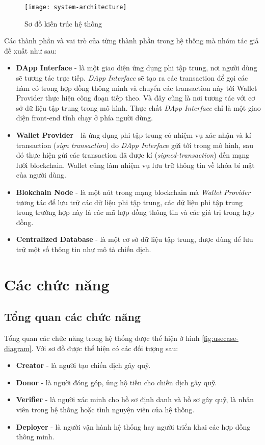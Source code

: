 \documentclass[../main-report.tex]{subfiles}
\begin{document}
\begin{figure}[ht!]
\begin{center}
\label{fig:system-architecture}
\texttt{[image: system-architecture]}
\caption{Sơ đồ kiến trúc hệ thống}
\end{center}
\end{figure}

Các thành phần và vai trò của từng thành phần trong hệ thống mà nhóm tác giả đề xuất như sau:

\begin{itemize}
\item \textbf{DApp Interface} - là một giao diện ứng dụng phi tập trung, nơi người dùng sẽ tương tác trực tiếp. \textit{DApp Interface} sẽ tạo ra các \gls{transaction} để gọi các hàm có trong hợp đồng thông minh và chuyển các \gls{transaction} này tới Wallet Provider thực hiện công đoạn tiếp theo. Và đây cũng là nơi tương tác với cơ sở dữ liệu tập trung trong mô hình. Thực chất \textit{DApp Interface} chỉ là một giao diện front-end tĩnh chạy ở phía người dùng.
\item \textbf{Wallet Provider} - là ứng dụng phi tập trung có nhiệm vụ xác nhận và kí transaction (\textit{sign transaction}) do \textit{DApp Interfac}e gửi tới trong mô hình, sau đó thực hiện gửi các \gls{transaction} đã được kí (\textit{signed-transaction}) đến mạng lưới \gls{blockchain}. Wallet cũng làm nhiệm vụ lưu trữ thông tin về khóa bí mật của người dùng.
\item \textbf{Blokchain Node} - là một nút trong mạng \gls{blockchain} mà \textit{Wallet Provider} tương tác để lưu trữ các dữ liệu phi tập trung, các dữ liệu phi tập trung trong trường hợp này là các mã hợp đồng thông tin và các giá trị trong hợp đồng.
\item \textbf{Centralized Database} - là một cơ sở dữ liệu tập trung, được dùng để lưu trữ một số thông tin như mô tả chiến dịch.
\end{itemize}

\section{Các chức năng}
\subsection{Tổng quan các chức năng}
Tổng quan các chức năng trong hệ thống được thể hiện ở hình \ref{fig:usecase-diagram}. Với sơ đồ được thể hiện có các đối tượng sau:

\begin{itemize}
\item \textbf{Creator} - là người tạo chiến dịch gây quỹ.
\item \textbf{Donor} - là người đóng góp, ủng hộ tiến cho chiến dịch gây quỹ.
\item \textbf{Verifier} - là người xác minh cho hồ sơ định danh và hồ sơ gây quỹ, là nhân viên trong hệ thống hoặc tình nguyện viên của hệ thống.
\item \textbf{Deployer} - là người vận hành hệ thống hay người triển khai các hợp đồng thông minh.
\end{itemize}
\end{document}

